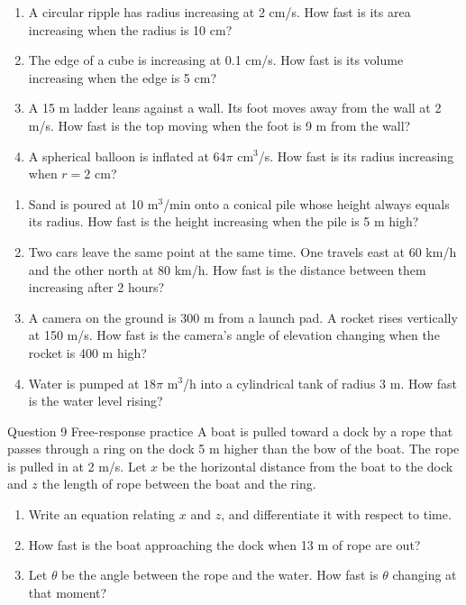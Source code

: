 \documentclass[11pt]{article}
\begin{document}
\begin{enumerate}[leftmargin=*,itemsep=2pt]
  \item A circular ripple has radius increasing at 2 cm/s. How fast is its area increasing when the radius is 10 cm?\work{2.3cm}
  \item The edge of a cube is increasing at 0.1 cm/s. How fast is its volume increasing when the edge is 5 cm?\work{2.3cm}
  \item A 15 m ladder leans against a wall. Its foot moves away from the wall at 2 m/s. How fast is the top moving when the foot is 9 m from the wall?\work{2.3cm}
  \item A spherical balloon is inflated at $64\pi$ cm$^3$/s. How fast is its radius increasing when $r=2$ cm?\work{2.3cm}
\end{enumerate}

\begin{enumerate}[leftmargin=*,itemsep=2pt,start=5]
  \item Sand is poured at 10 m$^3$/min onto a conical pile whose height always equals its radius. How fast is the height increasing when the pile is 5 m high?\work{2.8cm}
  \item Two cars leave the same point at the same time. One travels east at 60 km/h and the other north at 80 km/h. How fast is the distance between them increasing after 2 hours?\work{2.8cm}
  \item A camera on the ground is 300 m from a launch pad. A rocket rises vertically at 150 m/s. How fast is the camera's angle of elevation changing when the rocket is 400 m high?\work{2.8cm}
  \item Water is pumped at $18\pi$ m$^3$/h into a cylindrical tank of radius 3 m. How fast is the water level rising?\work{2.8cm}
\end{enumerate}

\begin{frbox}{Question 9 \textperiodcentered{} Free-response practice}
A boat is pulled toward a dock by a rope that passes through a ring on the dock 5 m higher than the bow of the boat. The rope is pulled in at 2 m/s. Let $x$ be the horizontal distance from the boat to the dock and $z$ the length of rope between the boat and the ring.
\begin{enumerate}[label=(\alph*),leftmargin=*,itemsep=2pt]
  \item Write an equation relating $x$ and $z$, and differentiate it with respect to time.\work{2.6cm}
  \item How fast is the boat approaching the dock when 13 m of rope are out?\work{2.6cm}
  \item Let $\theta$ be the angle between the rope and the water. How fast is $\theta$ changing at that moment?\work{2.6cm}
\end{enumerate}
\end{frbox}
\end{document}
